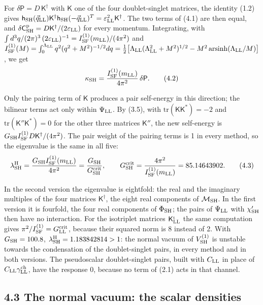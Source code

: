 \documentclass[
  10pt,
]{article}
\begin{document}
For \(\delta\mathsf P=D\,\mathsf K^\dagger\) with \(\mathsf K\) one of
the four doublet-singlet matrices, the identity (1.2) gives
\(\mathsf h_{\rm SH}(\vec q_{\rm LL})\mathsf K^\dagger\mathsf h_{\rm SH}(-\vec q_{\rm LL})^T=\varepsilon_{\rm LL}^2\mathsf K^\dagger\).
The two terms of (4.1) are then equal, and
\(\delta\mathsf C^{\rm p}_{\rm SH}=D\mathsf K^\dagger/(2\varepsilon_{\rm LL})\)
for every momentum. Integrating, with
\(\int d^3q/(2\pi)^3\,(2\varepsilon_{\rm LL})^{-1}=I^{(1)}_{\rm SF}(m_{\rm LL})/(4\pi^2)\)
and
\(I^{(1)}_{\rm SF}(M)=\int_0^{\Lambda_{\rm LL}}q^2(q^2+M^2)^{-1/2}dq=\tfrac12\big[\Lambda_{\rm LL}(\Lambda_{\rm LL}^2+M^2)^{1/2}-M^2\,\mathrm{arsinh}(\Lambda_{\rm LL}/M)\big]\),
we get
\[\kappa_{\rm SH}=\frac{I^{(1)}_{\rm SF}(m_{\rm LL})}{4\pi^2}\,\delta\mathsf P.\tag{4.2}\]

Only the pairing term of \(\mathsf K\) produces a pair self-energy in
this direction; the bilinear terms act only within \(\Psi_{\rm LL}\). By
(3.5), with \(\mathrm{tr}(\mathsf K\mathsf K^*)=-2\) and
\(\mathrm{tr}(\mathsf K''\mathsf K^*)=0\) for the other three matrices
\(\mathsf K''\), the new self-energy is
\(G_{\rm SH}I^{(1)}_{\rm SF}D\mathsf K^\dagger/(4\pi^2)\). The pair
weight of the pairing terms is 1 in every method, so the eigenvalue is
the same in all five:
\[\lambda^{\rm H}_{\rm SH}=\frac{G_{\rm SH}I^{(1)}_{\rm SF}(m_{\rm LL})}{4\pi^2}=\frac{G_{\rm SH}}{G^{\rm crit}_{\rm SH}},\qquad
G^{\rm crit}_{\rm SH}=\frac{4\pi^2}{I^{(1)}_{\rm SF}(m_{\rm LL})}=85.14643902.\tag{4.3}\]

In the second version the eigenvalue is eightfold: the real and the
imaginary multiples of the four matrices \(\mathsf K^\dagger\), the
eight real components of \(\mathcal M_{\rm SH}\). In the first version
it is fourfold, the four real components of \(\Phi_{\rm SH}\); the pairs
of \(\Psi_{\rm LL}\) with \(\chi'_{\rm SH}\) then have no interaction.
For the isotriplet matrices \(\mathsf K^\iota_{\rm LL}\) the same
computation gives \(\pi^2/I^{(1)}_{\rm SF}=G^{\rm crit}_{\rm LL}\),
because their squared norm is 8 instead of 2. With \(G_{\rm SH}=100.8\),
\(\lambda^{\rm H}_{\rm SH}=1.183842814>1\): the normal vacuum of
\(V^{(1)}_{\rm SH}\) is unstable towards the condensation of the
doublet-singlet pairs, in every method and in both versions. The
pseudoscalar doublet-singlet pairs, built with \(C_{\rm LL}\) in place
of \(C_{\rm LL}\gamma^{\rm ch}_{\rm LL}\), have the response 0, because
no term of (2.1) acts in that channel.

\hypertarget{the-normal-vacuum-the-scalar-densities}{%
\subsection{4.3 The normal vacuum: the scalar
densities}\label{the-normal-vacuum-the-scalar-densities}}
\end{document}
